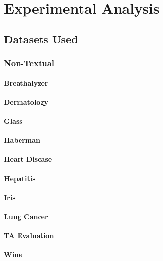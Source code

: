\documentclass[a4paper,11pt]{report}
\begin{document}
\chapter{Experimental Analysis}
\section{Datasets Used}
\subsection{Non-Textual}
\subsubsection*{Breathalyzer}\label{sec:breathalyzer}
\subsubsection*{Dermatology}\label{sec:dermatology}
\subsubsection*{Glass}\label{sec:glass}
\subsubsection*{Haberman}\label{sec:haberman}
\subsubsection*{Heart Disease}\label{sec:heart_disease}
\subsubsection*{Hepatitis}\label{sec:hepatitis}
\subsubsection*{Iris}\label{sec:iris}
\subsubsection*{Lung Cancer}\label{sec:lung_cancer}
\subsubsection*{TA Evaluation}\label{sec:taevaluation}
\subsubsection*{Wine}\label{sec:wine}
\end{document}
